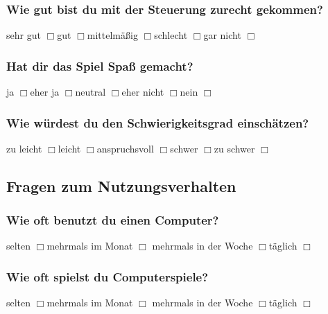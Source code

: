 \documentclass[10pt, a4paper,onecolumn]{article}
\begin{document}
\subsubsection*{Wie gut bist du mit der Steuerung zurecht gekommen?}
\noindent
sehr gut $\Box{}$\hspace{0.5cm}gut $\Box{}$\hspace{0.5cm}mittelmäßig
$\Box{}$\hspace{0.5cm}schlecht $\Box{}$\hspace{0.5cm}gar nicht $\Box{}$

\subsubsection*{Hat dir das Spiel Spaß gemacht?}
\noindent
ja $\Box{}$\hspace{0.5cm}eher ja $\Box{}$\hspace{0.5cm}neutral
$\Box{}$\hspace{0.5cm}eher nicht $\Box{}$\hspace{0.5cm}nein $\Box{}$

\subsubsection*{Wie würdest du den Schwierigkeitsgrad einschätzen?}
\noindent
zu leicht $\Box{}$\hspace{0.5cm}leicht $\Box{}$\hspace{0.5cm}anspruchsvoll
$\Box{}$\hspace{0.5cm}schwer $\Box{}$\hspace{0.5cm}zu schwer $\Box{}$

\newpage
\subsection*{Fragen zum Nutzungsverhalten}

\subsubsection*{Wie oft benutzt du einen Computer?}
\noindent
selten $\Box{}$\hspace{0.5cm}mehrmals im Monat $\Box{}$\hspace{0.5cm}
mehrmals in der Woche $\Box{}$\hspace{0.5cm}täglich $\Box{}$

\subsubsection*{Wie oft spielst du Computerspiele?}
\noindent
selten $\Box{}$\hspace{0.5cm}mehrmals im Monat $\Box{}$\hspace{0.5cm}
mehrmals in der Woche $\Box{}$\hspace{0.5cm}täglich $\Box{}$
\end{document}
